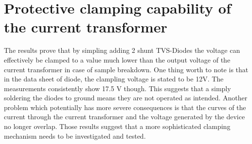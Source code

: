 \section{Protective clamping capability of the current transformer}
The results prove that by simpling adding 2 shunt TVS-Diodes the voltage can effectively be clamped to a value much lower
than the output voltage of the current transformer in case of sample breakdown.
One thing worth to note is that in the data sheet of diode, the clampling voltage is stated to be 12V. The measurements consistently show 17.5 V though.
This suggests that a simply soldering the diodes to ground means they are not operated as intended.
\newline
Another problem which potentially has more severe consequences is that the curves of the current through
the current transformer and the voltage generated by the device no longer overlap.
Those results suggest that a more sophisticated clamping mechanism needs to be investigated and tested.


